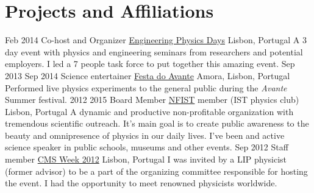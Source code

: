 \documentclass[letterpaper]{twentysecondcv} %
\begin{document}
\section{Projects and Affiliations}

\begin{twenty}
    \twentyitem
        {Feb 2014}
        {}
        {Co-host and Organizer}
        {\href{http://jornadasdefisica.nfist.pt/index.html}{Engineering Physics Days}}
        {Lisbon, Portugal}
        {A 3 day event with physics and engineering seminars from researchers and potential employers. I led a 7 people task force to put together this amazing event.}
    \twentyitem
        {Sep 2013}
        {Sep 2014}
        {Science entertainer}
        {\href{http://festadoavante.pcp.pt/2016/}{Festa do Avante}}
        {Amora, Lisbon, Portugal}
        {Performed live physics experiments to the general public during the \emph{Avante} Summer festival.}
    \twentyitem
        {2012}
        {2015}
        {Board Member}
        {\href{http://nfist.pt}{NFIST} member (IST physics club)}
        {Lisbon, Portugal}
        {A dynamic and productive non-profitable organization with tremendous scientific outreach. It's main goal is to create public awareness to the beauty and omnipresence of physics in our daily lives. I've been and active science speaker in public schools, museums and other events.}
    \twentyitem
        {Sep 2012}
        {}
        {Staff member}
        {\href{http://www.lip.pt/cmsweek2012/}{CMS Week 2012}}
        {Lisbon, Portugal}
        {I was invited by a LIP physicist (former advisor) to be a part of the organizing committee responsible for hosting the event. I had the opportunity to meet renowned physicists worldwide.}
\end{twenty}
\end{document}
